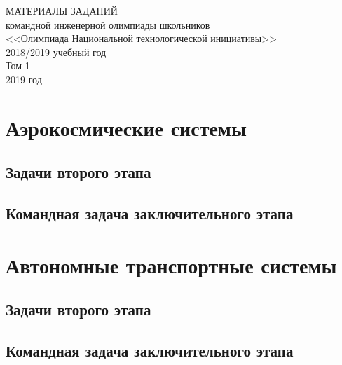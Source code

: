 \documentclass[a4paper,12pt,oneside]{book}
\begin{document}
\begin{titlepage}
    \begin{center}
        \huge{МАТЕРИАЛЫ ЗАДАНИЙ} \\
        \Large{командной инженерной олимпиады школьников} \\
        \Large{<<Олимпиада Национальной технологической инициативы>>} \\
        \large{2018/2019 учебный год} \\
        \large{Том 1} \\
        \vspace{14cm}
        \Large{2019 год}  
    \end{center}
  \end{titlepage}
\setcounter{tocdepth}{1}

\tableofcontents

\part{Аэрокосмические системы}
\clearpage
\chapter{Задачи второго этапа}



\clearpage
\chapter{Командная задача заключительного этапа}


\part{Автономные транспортные системы}
\clearpage
\chapter{Задачи второго этапа}

\clearpage
\chapter{Командная задача заключительного этапа}

\end{document}
